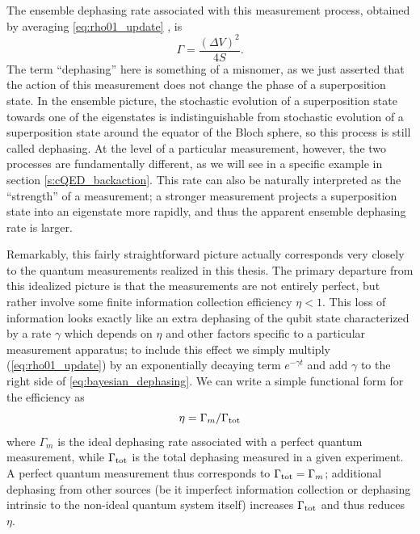The ensemble dephasing rate associated with this measurement process, obtained by averaging \eqref{eq:rho01_update} \cite{koro11}, is
\begin{equation}
\Gamma = \frac{(\Delta V)^2}{4S}.
\label{eq:bayesian_dephasing}
\end{equation}
The term ``dephasing'' here is something of a misnomer, as we just asserted that the action of this measurement does not change the phase of a superposition state.  In the ensemble picture, the stochastic evolution of a superposition state towards one of the eigenstates is indistinguishable from stochastic evolution of a superposition state around the equator of the Bloch sphere, so this process is still called dephasing.  At the level of a particular measurement, however, the two processes are fundamentally different, as we will see in a specific example in section \ref{s:cQED_backaction}.  This rate can also be naturally interpreted as the ``strength'' of a measurement; a stronger measurement projects a superposition state into an eigenstate more rapidly, and thus the apparent ensemble dephasing rate is larger.

Remarkably, this fairly straightforward picture actually corresponds very closely to the quantum measurements realized in this thesis.  The primary departure from this idealized picture is that the measurements are not entirely perfect, but rather involve some finite information collection efficiency $\eta < 1$.  This loss of information looks exactly like an extra dephasing of the qubit state characterized by a rate $\gamma$ which depends on $\eta$ and other factors specific to a particular measurement apparatus; to include this effect we simply multiply (\ref{eq:rho01_update}) by an exponentially decaying term $e^{-\gamma t}$ and add $\gamma$ to the right side of \eqref{eq:bayesian_dephasing}.  We can write a simple functional form for the efficiency as
\begin{equation}
\eta = \Gamma_m / \Gamma_{\rm tot}
\label{eq:eta_basic_form}
\end{equation}
where $\Gamma_m$ is the ideal dephasing rate associated with a perfect quantum measurement, while $\Gamma_{\rm tot}$ is the total dephasing measured in a given experiment.  A perfect quantum measurement thus corresponds to $\Gamma_{\rm tot} = \Gamma_m$; additional dephasing from other sources (be it imperfect information collection or dephasing intrinsic to the non-ideal quantum system itself) increases $\Gamma_{\rm tot}$ and thus reduces $\eta$.

